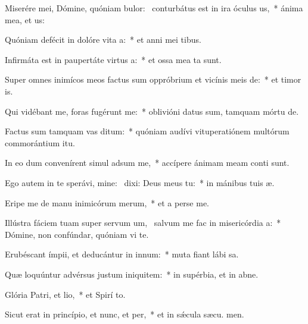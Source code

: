 \item Miserére mei, Dómine, quóniam bulor:~\pscross{} conturbátus est in ira óculus us,~* ánima mea, et  us:
\item Quóniam defécit in dolóre vita a:~* et anni mei  tibus.
\item Infirmáta est in paupertáte virtus a:~* et ossa mea ta sunt.
\item Super omnes inimícos meos factus sum oppróbrium et vicínis meis de:~* et timor  is.
\item Qui vidébant me, foras fugérunt  me:~* oblivióni datus sum, tamquam mórtu  de.
\item Factus sum tamquam vas ditum:~* quóniam audívi vituperatiónem multórum commorántium  itu.
\item In eo dum convenírent simul adsum me,~* accípere ánimam meam conti sunt.
\item Ego autem in te sperávi, mine:~\pscross{} dixi: Deus meus  tu:~* in mánibus tuis  æ.
\item Eripe me de manu inimicórum merum,~* et a perse me.
\item Illústra fáciem tuam super servum um,~\pscross{} salvum me fac in misericórdia a:~* Dómine, non confúndar, quóniam vi te.
\item Erubéscant ímpii, et deducántur in innum:~* muta fiant lábi sa.
\item Quæ loquúntur advérsus justum iniquitem:~* in supérbia, et in abne.
\item Glória Patri, et lio,~* et Spirí to.
\item Sicut erat in princípio, et nunc, et per,~* et in sǽcula sæcu. men.

